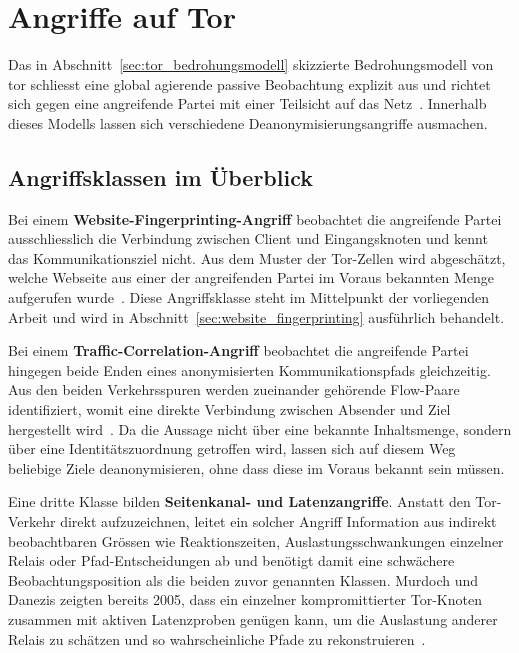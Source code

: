 \section{Angriffe auf Tor}
\label{sec:angriffe_auf_tor}

Das in Abschnitt~\ref{sec:tor_bedrohungsmodell} skizzierte Bedrohungsmodell von \gls{tor} schliesst eine global agierende passive Beobachtung explizit aus und richtet sich gegen eine angreifende Partei mit einer Teilsicht auf das Netz~\cite{dingledine2004tor}.
Innerhalb dieses Modells lassen sich verschiedene Deanonymisierungsangriffe ausmachen.

\subsection{Angriffsklassen im Überblick}

Bei einem \textbf{Website-Fingerprinting-Angriff} beobachtet die angreifende Partei ausschliesslich die Verbindung zwischen Client und Eingangsknoten und kennt das Kommunikationsziel nicht.
Aus dem Muster der Tor-Zellen wird abgeschätzt, welche Webseite aus einer der angreifenden Partei im Voraus bekannten Menge aufgerufen wurde~\cite{jansen2023data}.
Diese Angriffsklasse steht im Mittelpunkt der vorliegenden Arbeit und wird in Abschnitt~\ref{sec:website_fingerprinting} ausführlich behandelt.

Bei einem \textbf{Traffic-Correlation-Angriff} beobachtet die angreifende Partei hingegen beide Enden eines anonymisierten Kommunikationspfads gleichzeitig.
Aus den beiden Verkehrsspuren werden zueinander gehörende Flow-Paare identifiziert, womit eine direkte Verbindung zwischen Absender und Ziel hergestellt wird~\cite{nasr2018deepcorr}.
Da die Aussage nicht über eine bekannte Inhaltsmenge, sondern über eine Identitätszuordnung getroffen wird, lassen sich auf diesem Weg beliebige Ziele deanonymisieren, ohne dass diese im Voraus bekannt sein müssen.

Eine dritte Klasse bilden \textbf{Seitenkanal- und Latenzangriffe}.
Anstatt den Tor-Verkehr direkt aufzuzeichnen, leitet ein solcher Angriff Information aus indirekt beobachtbaren Grössen wie Reaktionszeiten, Auslastungsschwankungen einzelner Relais oder Pfad-Entscheidungen ab und benötigt damit eine schwächere Beobachtungsposition als die beiden zuvor genannten Klassen.
Murdoch und Danezis zeigten bereits 2005, dass ein einzelner kompromittierter Tor-Knoten zusammen mit aktiven Latenzproben genügen kann, um die Auslastung anderer Relais zu schätzen und so wahrscheinliche Pfade zu rekonstruieren~\cite{murdoch2005low}.

